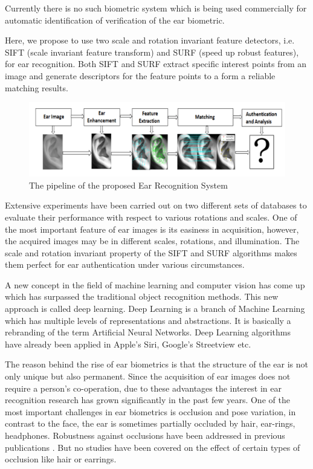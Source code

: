 Currently there is no such biometric system which is being used commercially for automatic identification of verification of the ear biometric.

Here, we propose to use two scale and rotation invariant feature detectors, i.e. SIFT (scale invariant feature transform) and SURF (speed up robust features), for ear recognition. Both SIFT and SURF extract specific interest points from an image and generate descriptors for the feature points to a form a reliable matching results.\\
\begin{figure}[t]
	\includegraphics[width=\textwidth]{Figures/Figure1}
	\caption{The pipeline of the proposed Ear Recognition System}
	\label{fig:Figure1}
\end{figure}
Extensive experiments have been carried out on two different sets of databases to evaluate their performance with respect to various rotations and scales. One of the most important feature of ear images is its easiness in acquisition, however, the acquired images may be in different scales, rotations, and illumination. The scale and rotation invariant property of the SIFT and SURF algorithms makes them perfect for ear authentication under various circumstances.

 A new concept in the field of machine learning and computer vision has come up which has surpassed the traditional object recognition methods. This new approach is called deep learning. Deep Learning is a branch of Machine Learning which has multiple levels of representations and abstractions. It is basically a rebranding of the term Artificial Neural Networks. Deep Learning algorithms have already been applied in Apple's Siri, Google's Streetview etc. 
 
 The reason behind the rise of ear biometrics is that the structure of the ear is not only unique but also permanent. Since the acquisition of ear images does not require a person's co-operation, due to these advantages the interest in ear recognition research has grown significantly in the past few years. One of the most important challenges in ear biometrics is occlusion and pose variation, in contrast to the face, the ear is sometimes partially occluded by hair, ear-rings, headphones. Robustness against occlusions have been addressed in previous publications \cite{pflug2012ear}. But no studies have been covered on the effect of certain types of occlusion like hair or earrings. 
 
